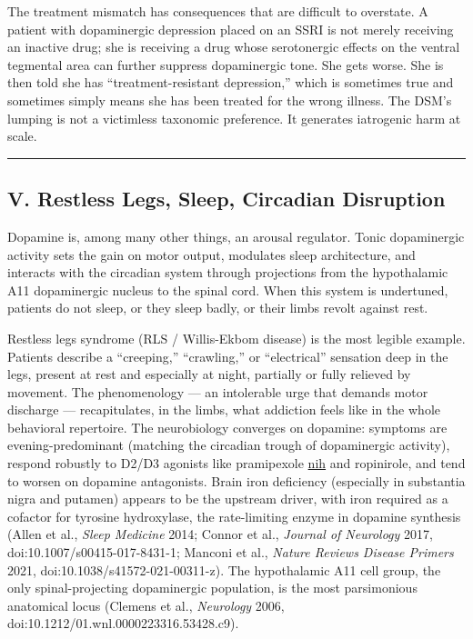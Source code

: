 The treatment mismatch has consequences that are difficult to overstate. A patient with dopaminergic depression placed on an SSRI is not merely receiving an inactive drug; she is receiving a drug whose serotonergic effects on the ventral tegmental area can further suppress dopaminergic tone. She gets worse. She is then told she has ``treatment-resistant depression,'' which is sometimes true and sometimes simply means she has been treated for the wrong illness. The DSM's lumping is not a victimless taxonomic preference. It generates iatrogenic harm at scale.

\begin{center}\rule{0.5\linewidth}{0.5pt}\end{center}

\subsection{V. Restless Legs, Sleep, Circadian Disruption}\label{09_dopamine_spectrum-v.-restless-legs-sleep-circadian-disruption}

Dopamine is, among many other things, an arousal regulator. Tonic dopaminergic activity sets the gain on motor output, modulates sleep architecture, and interacts with the circadian system through projections from the hypothalamic A11 dopaminergic nucleus to the spinal cord. When this system is undertuned, patients do not sleep, or they sleep badly, or their limbs revolt against rest.

Restless legs syndrome (RLS / Willis-Ekbom disease) is the most legible example. Patients describe a ``creeping,'' ``crawling,'' or ``electrical'' sensation deep in the legs, present at rest and especially at night, partially or fully relieved by movement. The phenomenology --- an intolerable urge that demands motor discharge --- recapitulates, in the limbs, what addiction feels like in the whole behavioral repertoire. The neurobiology converges on dopamine: symptoms are evening-predominant (matching the circadian trough of dopaminergic activity), respond robustly to D2/D3 agonists like pramipexole \href{https://www.ncbi.nlm.nih.gov/pmc/articles/PMC9771278/}{nih} and ropinirole, and tend to worsen on dopamine antagonists. Brain iron deficiency (especially in substantia nigra and putamen) appears to be the upstream driver, with iron required as a cofactor for tyrosine hydroxylase, the rate-limiting enzyme in dopamine synthesis (Allen et al., \emph{Sleep Medicine} 2014; Connor et al., \emph{Journal of Neurology} 2017, doi:10.1007/s00415-017-8431-1; Manconi et al., \emph{Nature Reviews Disease Primers} 2021, doi:10.1038/s41572-021-00311-z). The hypothalamic A11 cell group, the only spinal-projecting dopaminergic population, is the most parsimonious anatomical locus (Clemens et al., \emph{Neurology} 2006, doi:10.1212/01.wnl.0000223316.53428.c9).


